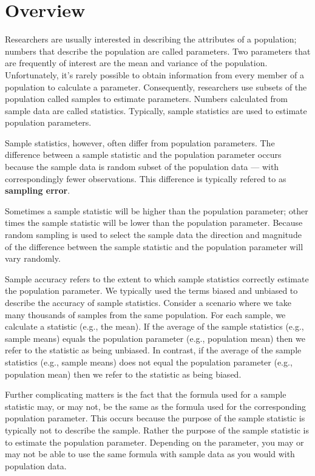 \documentclass[
]{krantz}
\begin{document}
\hypertarget{overview}{%
\section{Overview}\label{overview}}

Researchers are usually interested in describing the attributes of a population; numbers that describe the population are called parameters. Two parameters that are frequently of interest are the mean and variance of the population. Unfortunately, it's rarely possible to obtain information from every member of a population to calculate a parameter. Consequently, researchers use subsets of the population called samples to estimate parameters. Numbers calculated from sample data are called statistics. Typically, sample statistics are used to estimate population parameters.

Sample statistics, however, often differ from population parameters. The difference between a sample statistic and the population parameter occurs because the sample data is random subset of the population data --- with correspondingly fewer observations. This difference is typically refered to as \textbf{sampling error}.

Sometimes a sample statistic will be higher than the population parameter; other times the sample statistic will be lower than the population parameter. Because random sampling is used to select the sample data the direction and magnitude of the difference between the sample statistic and the population parameter will vary randomly.

Sample accuracy refers to the extent to which sample statistics correctly estimate the population parameter. We typically used the terms biased and unbiased to describe the accuracy of sample statistics. Consider a scenario where we take many thousands of samples from the same population. For each sample, we calculate a statistic (e.g., the mean). If the average of the sample statistics (e.g., sample means) equals the population parameter (e.g., population mean) then we refer to the statistic as being unbiased. In contrast, if the average of the sample statistics (e.g., sample means) does not equal the population parameter (e.g., population mean) then we refer to the statistic as being biased.

Further complicating matters is the fact that the formula used for a sample statistic may, or may not, be the same as the formula used for the corresponding population parameter. This occurs because the purpose of the sample statistic is typically not to describe the sample. Rather the purpose of the sample statistic is to estimate the population parameter. Depending on the parameter, you may or may not be able to use the same formula with sample data as you would with population data.
\end{document}
